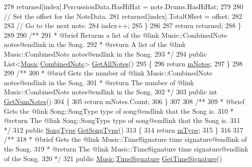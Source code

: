 \begin{DoxyCodeInclude}
278             returned[index].PercussionData.HasHiHat = note.Drums.HasHiHat;
279 
280             \textcolor{comment}{// Set the offset for the NoteData.}
281             returned[index].TotalOffset = offset;
282 
283             \textcolor{comment}{// Go to the next note.}
284             index++;
285         \}
286 
287         \textcolor{keywordflow}{return} returned;
288     \}
289 \textcolor{comment}{}
290 \textcolor{comment}{    /**}
291 \textcolor{comment}{     * @brief Returns a list of the @link Music::CombinedNote notes@endlink in the Song.}
292 \textcolor{comment}{     * @return A list of the @link Music::CombinedNote notes@endlink in the Song.}
293 \textcolor{comment}{    */}
294     \textcolor{keyword}{public} List<\hyperlink{class_music}{Music}.\hyperlink{group___music_structs_struct_music_1_1_combined_note}{CombinedNote}> \hyperlink{group___song_pub_func_ga842675b7691fca074ee394031afc7675}{GetAllNotes}()
295     \{
296         \textcolor{keywordflow}{return} \hyperlink{group___song_priv_var_ga674bc904a1f856d485d5fb7fe84bac85}{mNotes};
297     \}
298 \textcolor{comment}{}
299 \textcolor{comment}{    /**}
300 \textcolor{comment}{     * @brief Gets the number of @link Music::CombinedNote notes@endlink in the Song.}
301 \textcolor{comment}{     * @return The number of @link Music::CombinedNote notes@endlink in the Song.}
302 \textcolor{comment}{    */}
303     \textcolor{keyword}{public} \textcolor{keywordtype}{int} \hyperlink{group___song_pub_func_gad124d0af146885327f8ac455bc013b63}{GetNumNotes}()
304     \{
305         \textcolor{keywordflow}{return} mNotes.Count;
306     \}
307 \textcolor{comment}{}
308 \textcolor{comment}{    /**}
309 \textcolor{comment}{     * @brief Gets the @link Song::SongType type of song@endlink that the Song is.}
310 \textcolor{comment}{     * @return The @link Song::SongType type of song@endlink that the Song is.}
311 \textcolor{comment}{    */}
312     \textcolor{keyword}{public} \hyperlink{group___song_enums_gae681a1f001333e39fc1cb4fea97bfe1b}{SongType} \hyperlink{group___song_pub_func_gabae5b5d8f727b2d9da7867a99347f86b}{GetSongType}()
313     \{
314         \textcolor{keywordflow}{return} \hyperlink{group___song_priv_var_gaf3b9d0f461522324f897b746311b43c5}{mType};
315     \}
316 \textcolor{comment}{}
317 \textcolor{comment}{    /**}
318 \textcolor{comment}{     * @brief Gets the @link Music::TimeSignature time signature@endlink of the Song.}
319 \textcolor{comment}{     * @return The @link Music::TimeSignature time signature@endlink of the Song.}
320 \textcolor{comment}{    */}
321     \textcolor{keyword}{public} \hyperlink{class_music}{Music}.\hyperlink{group___music_structs_struct_music_1_1_time_signature}{TimeSignature} \hyperlink{group___song_pub_func_ga26315bb6d554d46e2eba2ac03ee70cc1}{GetTimeSignature}()

\end{DoxyCodeInclude}
